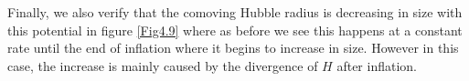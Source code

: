 \documentclass[a4paper,12pt,twoside]{report}
\begin{document}
Finally, we also verify that the comoving Hubble radius is decreasing in size with this potential in figure \ref{Fig4.9} where as before we see this happens at a constant rate until the end of inflation where it begins to increase in size. However in this case, the increase is mainly caused by the divergence of $H$ after inflation.

\noindent%
\begin{minipage}{\linewidth}%
\label{Fig4.7}
\end{minipage}
\end{document}
